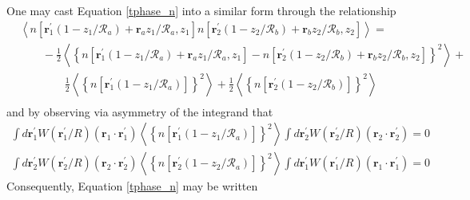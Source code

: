One may cast Equation \ref{tphase_n} into a similar form through the relationship
\begin{equation}
\begin{aligned}
&  \left\langle n\left[\boldsymbol{r}^{\prime}_{1}\left(1-z_{1}/\mathcal{R}_{a}\right) + \boldsymbol{r}_{a} z_{1}/\mathcal{R}_{a}, z_{1}\right]
n\left[\boldsymbol{r}^{\prime}_{2}\left(1-z_{2}/\mathcal{R}_{b}\right) + \boldsymbol{r}_{b} z_{2}/\mathcal{R}_{b}, z_{2}\right] \right\rangle = \\
& \quad\quad -\frac{1}{2}\left\langle \left\{ n\left[\boldsymbol{r}^{\prime}_{1}\left(1-z_{1}/\mathcal{R}_{a}\right) + \boldsymbol{r}_{a} z_{1}/\mathcal{R}_{a}, z_{1}\right] - 
 n\left[\boldsymbol{r}^{\prime}_{2}\left(1-z_{2}/\mathcal{R}_{b}\right) + \boldsymbol{r}_{b} z_{2}/\mathcal{R}_{b}, z_{2}\right]\right\}^{2} \right\rangle + \\
&\quad\quad\quad\quad \frac{1}{2}\left\langle \left\{ n\left[\boldsymbol{r}^{\prime}_{1}\left(1-z_{1}/\mathcal{R}_{a}\right)\right]\right\}^{2}\right\rangle + 
\frac{1}{2}\left\langle \left\{ n\left[\boldsymbol{r}^{\prime}_{2}\left(1-z_{2}/\mathcal{R}_{b}\right)\right]\right\}^{2}\right\rangle \\
\end{aligned}
\end{equation}
and by observing via asymmetry of the integrand that
\begin{equation}\label{intzero}
\begin{aligned}
\int d\boldsymbol{r}^{\prime}_{1} W\left(\boldsymbol{r}^{\prime}_{1}/R\right) \left(\boldsymbol{r}_{1}\cdot\boldsymbol{r}^{\prime}_{1}\right)
\left\langle \left\{ n\left[\boldsymbol{r}^{\prime}_{1}\left(1-z_{1}/\mathcal{R}_{a}\right)\right]\right\}^{2}\right\rangle
\int d\boldsymbol{r}^{\prime}_{2} W\left(\boldsymbol{r}^{\prime}_{2}/R\right) \left(\boldsymbol{r}_{2}\cdot\boldsymbol{r}^{\prime}_{2}\right) = 0 \\
\int d\boldsymbol{r}^{\prime}_{2} W\left(\boldsymbol{r}^{\prime}_{2}/R\right) \left(\boldsymbol{r}_{2}\cdot\boldsymbol{r}^{\prime}_{2}\right) 
\left\langle \left\{ n\left[\boldsymbol{r}^{\prime}_{2}\left(1-z_{2}/\mathcal{R}_{a}\right)\right]\right\}^{2}\right\rangle
\int d\boldsymbol{r}^{\prime}_{1} W\left(\boldsymbol{r}^{\prime}_{1}/R\right) \left(\boldsymbol{r}_{1}\cdot\boldsymbol{r}^{\prime}_{1}\right) = 0
\end{aligned}
\end{equation}
Consequently, Equation \ref{tphase_n} may be written 
